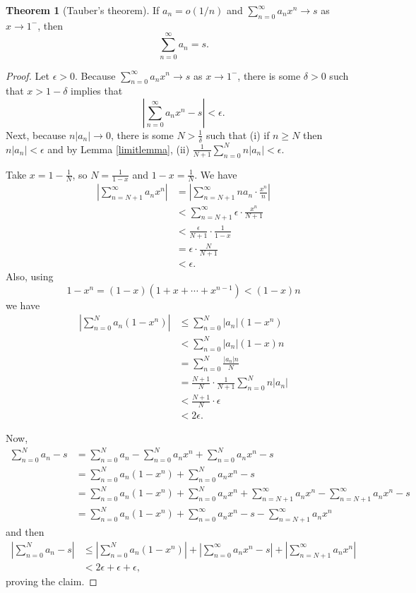 \documentclass{article}
\theoremstyle{definition}
\newtheorem{theorem}{Theorem}
\begin{document}
\begin{theorem}[Tauber's theorem]
If $a_n = o(1/n)$ and $\sum_{n=0}^\infty a_n x^n \to s$ as $x \to 1^-$, then 
\[
\sum_{n=0}^\infty a_n = s.
\]
\end{theorem}
\begin{proof}
Let $\epsilon>0$. 
Because $\sum_{n=0}^\infty a_n x^n \to s$ as $x \to 1^-$, there is some $\delta>0$ such that
$x>1-\delta$ implies that
\[
\left| \sum_{n=0}^\infty a_n x^n-s\right|<\epsilon.
\]
Next,
because $n|a_n| \to 0$,
there is some $N>\frac{1}{\delta}$ such that  (i) if $n \geq N$ then $n|a_n|<\epsilon$ and by Lemma \ref{limitlemma},
 (ii) 
$\frac{1}{N+1}  \sum_{n=0}^N n |a_n|  < \epsilon$.
 

Take $x=1-\frac{1}{N}$, so  $N=\frac{1}{1-x}$ and
$1-x = \frac{1}{N}$.
We have
\begin{align*}
\left| \sum_{n=N+1}^\infty a_n x^n \right| & = \left| \sum_{n=N+1}^\infty na_n \cdot \frac{x^n}{n} \right| \\
&< \sum_{n=N+1}^\infty \epsilon \cdot \frac{x^n}{N+1}\\
&< \frac{\epsilon}{N+1} \cdot \frac{1}{1-x}\\
&=\epsilon \cdot \frac{N}{N+1}\\
&<\epsilon.
\end{align*}
Also, using
\[
1-x^n = (1-x)(1+x+\cdots+x^{n-1}) < (1-x)n
\]
we have
\begin{align*}
\left| \sum_{n=0}^N a_n (1-x^n) \right|&\leq \sum_{n=0}^N |a_n| (1-x^n)\\
&< \sum_{n=0}^N |a_n| (1-x)n\\
&= \sum_{n=0}^N \frac{|a_n|n}{N}\\
&=\frac{N+1}{N} \cdot \frac{1}{N+1} \sum_{n=0}^N n|a_n|\\
&<\frac{N+1}{N} \cdot \epsilon\\
&<2\epsilon.
\end{align*}

Now,
\begin{align*}
\sum_{n=0}^N a_n - s&=\sum_{n=0}^N a_n - \sum_{n=0}^N a_n x^n + \sum_{n=0}^N a_nx^n - s\\
&=\sum_{n=0}^N a_n (1-x^n) + \sum_{n=0}^N a_nx^n -s\\
&=\sum_{n=0}^N a_n(1-x^n) + \sum_{n=0}^N a_nx^n + \sum_{n=N+1}^\infty a_nx^n
-\sum_{n=N+1}^\infty a_nx^n -s\\
&=\sum_{n=0}^N a_n(1-x^n) + \sum_{n=0}^\infty a_n x^n - s - \sum_{n=N+1}^\infty a_nx^n
\end{align*}
and then
\begin{align*}
\left|\sum_{n=0}^N a_n - s\right| &\leq \left| \sum_{n=0}^N a_n(1-x^n) \right|
+\left| \sum_{n=0}^\infty a_n x^n - s \right| + \left| \sum_{n=N+1}^\infty a_nx^n \right|\\
&< 2 \epsilon + \epsilon +  \epsilon,
\end{align*}
proving the claim.
\end{proof}
\end{document}

